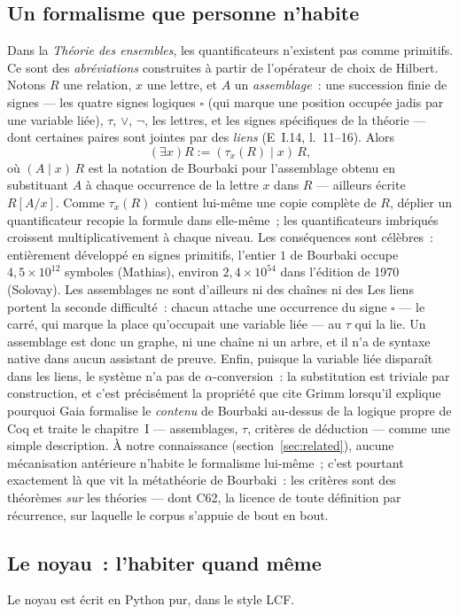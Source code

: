 \documentclass[11pt]{article}
\theoremstyle{remark}\newtheorem{example}{Exemple}
\begin{document}
\subsection{Un formalisme que personne n'habite}
\label{sec:tau}
Dans la \emph{Th\'eorie des ensembles}, les quantificateurs n'existent pas comme
primitifs. Ce sont des \emph{abréviations} construites à partir de l'opérateur de choix
de Hilbert. Notons $R$ une relation, $x$ une lettre, et $A$ un \emph{assemblage}~:
une succession finie de signes --- les quatre signes logiques $\square$ (qui marque
une position occupée jadis par une variable liée), $\tau$,
$\vee$, $\neg$, les lettres, et les signes spécifiques de la théorie --- dont
certaines paires sont jointes par des \emph{liens} (E~I.14, l.~11--16). Alors
\[ (\exists x)R := (\tau_x(R) \mid x)\,R , \]
où $(A \mid x)\,R$ est la notation de Bourbaki pour l'assemblage obtenu en substituant
$A$ à chaque occurrence de la lettre $x$ dans $R$ --- ailleurs écrite $R[A/x]$.
Comme $\tau_x(R)$ contient lui-même une copie complète de $R$, déplier un
quantificateur recopie la formule dans elle-même~; les quantificateurs imbriqués
croissent multiplicativement à chaque niveau. Les conséquences sont célèbres~:
entièrement développé en signes primitifs, l'entier $1$ de Bourbaki occupe
$4{,}5 \times 10^{12}$ symboles (Mathias), environ $2{,}4 \times 10^{54}$ dans
l'édition de 1970 (Solovay). Les assemblages ne sont d'ailleurs ni des chaînes ni des
Les liens portent la seconde difficulté~: chacun attache une occurrence du signe
$\square$ --- le carré, qui marque la place qu'occupait une variable liée --- au
$\tau$ qui la lie. Un assemblage est donc un graphe, ni une chaîne ni un arbre, et il
n'a de syntaxe native dans aucun assistant de preuve. Enfin,
puisque la variable liée disparaît dans les liens, le système n'a pas de
$\alpha$-conversion~: la substitution est triviale par construction, et c'est
précisément la propriété que cite Grimm lorsqu'il explique pourquoi Gaia formalise le
\emph{contenu} de Bourbaki au-dessus de la logique propre de Coq et traite le
chapitre~I --- assemblages, $\tau$, critères de déduction --- comme une simple
description. À notre connaissance (section~\ref{sec:related}), aucune mécanisation
antérieure n'habite le formalisme lui-même~; c'est pourtant exactement là que vit la
métathéorie de Bourbaki~: les critères sont des théorèmes \emph{sur} les théories
--- dont C62, la licence de toute définition par récurrence, sur laquelle le corpus
s'appuie de bout en bout.

\subsection{Le noyau~: l'habiter quand même}
Le noyau est écrit en Python pur, dans le style LCF.
\end{document}

